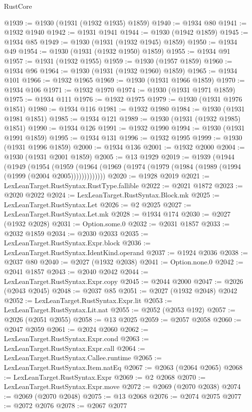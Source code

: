 \begin{lexlean}{RustCore}
\begin{coremodule}
@1939 := @1930 (@1931 (@1932 @1935) @1859)
@1940 := @1934 @80
@1941 := @1932 @1940
@1942 := @1931 @1941
@1944 := @1930 (@1942 @1859)
@1945 := @1934 @85
@1949 := @1930 (@1931 (@1932 @1945) @1859)
@1950 := @1934 @49
@1954 := @1930 (@1931 (@1932 @1950) @1859)
@1955 := @1934 @91
@1957 := @1931 (@1932 @1955)
@1959 := @1930 (@1957 @1859)
@1960 := @1934 @96
@1964 := @1930 (@1931 (@1932 @1960) @1859)
@1965 := @1934 @101
@1966 := @1932 @1965
@1969 := @1930 (@1931 @1966 @1859)
@1970 := @1934 @106
@1971 := @1932 @1970
@1974 := @1930 (@1931 @1971 @1859)
@1975 := @1934 @111
@1976 := @1932 @1975
@1979 := @1930 (@1931 @1976 @1851)
@1980 := @1934 @116
@1981 := @1932 @1980
@1984 := @1930 (@1931 @1981 @1851)
@1985 := @1934 @121
@1989 := @1930 (@1931 (@1932 @1985) @1851)
@1990 := @1934 @126
@1991 := @1932 @1990
@1994 := @1930 (@1931 @1991 @1859)
@1995 := @1934 @131
@1996 := @1932 @1995
@1999 := @1930 (@1931 @1996 @1859)
@2000 := @1934 @136
@2001 := @1932 @2000
@2004 := @1930 (@1931 @2001 @1859)
@2005 := @13 @1929
@2019 := @1939
    (@1944
      (@1949
        (@1954
          (@1959 (@1964 (@1969 (@1974 (@1979 (@1984 (@1989 (@1994 (@1999 (@2004 @2005)))))))))))))
@2020 := @1928 @2019
@2021 := LexLeanTarget.RustSyntax.RustType.fallible
@2022 := @2021 @1872
@2023 := @2020 @2022
@2024 := LexLeanTarget.RustSyntax.Block.mk
@2025 := LexLeanTarget.RustSyntax.Let
@2026 := @2 @2025
@2027 := LexLeanTarget.RustSyntax.Let.mk
@2028 := @1934 @174
@2030 := @2027 (@1932 @2028)
@2031 := Option.some.{0}
@2032 := @2031 @1857
@2033 := @2032 @1859
@2034 := @2030 @2033
@2035 := LexLeanTarget.RustSyntax.Expr.block
@2036 := LexLeanTarget.RustSyntax.IdentKind.operand
@2037 := @1924 @2036
@2038 := @2037 @80
@2040 := @2027 (@1932 @2038)
@2041 := Option.none.{0}
@2042 := @2041 @1857
@2043 := @2040 @2042
@2044 := LexLeanTarget.RustSyntax.Expr.copy
@2045 := @2044 @2000
@2047 := @2026 (@2043 @2045)
@2048 := @2037 @85
@2051 := @2027 (@1932 @2048) @2042
@2052 := LexLeanTarget.RustSyntax.Expr.lit
@2053 := LexLeanTarget.RustSyntax.Lit.nat
@2055 := @2052 (@2053 @192)
@2057 := @2026 (@2051 @2055)
@2058 := @13 @2025
@2059 := @2057 @2058
@2060 := @2047 @2059
@2061 := @2024 @2060
@2062 := LexLeanTarget.RustSyntax.Expr.cond
@2063 := LexLeanTarget.RustSyntax.Expr.call
@2064 := LexLeanTarget.RustSyntax.Callee.runtime
@2065 := LexLeanTarget.RustSyntax.Item.natEq
@2067 := @2063 (@2064 @2065)
@2068 := LexLeanTarget.RustSyntax.Expr
@2069 := @2 @2068
@2070 := LexLeanTarget.RustSyntax.Expr.move
@2072 := @2069 (@2070 @2038)
@2074 := @2069 (@2070 @2048)
@2075 := @13 @2068
@2076 := @2074 @2075
@2077 := @2072 @2076
@2078 := @2067 @2077

\end{coremodule}
\end{lexlean}
